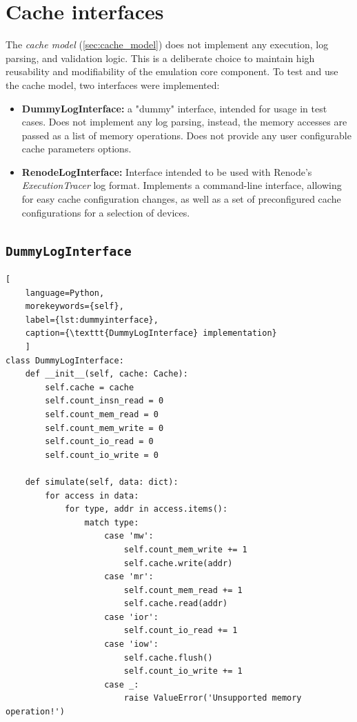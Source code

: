 \section{Cache interfaces}

The \textit{cache model} (\ref{sec:cache_model}) does not implement any execution, log parsing, and validation logic. This is a deliberate choice to maintain high reusability and modifiability
of the emulation core component. To test and use the cache model, two interfaces were implemented:

\begin{itemize}
	\item \textbf{DummyLogInterface:} a "dummy" interface, intended for usage in test cases. Does not implement any log parsing, instead, the memory accesses are passed as a list of
        memory operations. Does not provide any user configurable cache parameters options.
    \item \textbf{RenodeLogInterface:} Interface intended to be used with Renode's \textit{ExecutionTracer} log format. Implements a command-line interface, allowing for easy cache
        configuration changes, as well as a set of preconfigured cache configurations for a selection of devices.
\end{itemize}


\subsection{\texttt{DummyLogInterface}}

\begin{center}
\centering
\begin{minipage}{\linewidth}
\begin{lstlisting}[
    language=Python,
	morekeywords={self},
    label={lst:dummyinterface},
    caption={\texttt{DummyLogInterface} implementation}
    ]
class DummyLogInterface:
    def __init__(self, cache: Cache):
        self.cache = cache
        self.count_insn_read = 0
        self.count_mem_read = 0
        self.count_mem_write = 0
        self.count_io_read = 0
        self.count_io_write = 0

    def simulate(self, data: dict):
        for access in data:
            for type, addr in access.items():
                match type:
                    case 'mw':
                        self.count_mem_write += 1
                        self.cache.write(addr)
                    case 'mr':
                        self.count_mem_read += 1
                        self.cache.read(addr)
                    case 'ior':
                        self.count_io_read += 1
                    case 'iow':
                        self.cache.flush()
                        self.count_io_write += 1
                    case _:
                        raise ValueError('Unsupported memory operation!')
\end{lstlisting}
\end{minipage}
\end{center}

